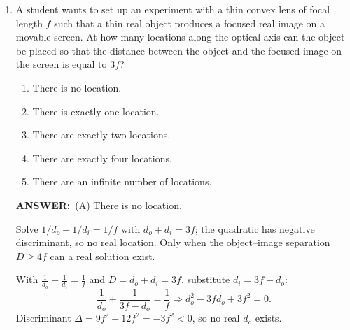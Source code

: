 \documentclass[12pt, a4paper]{article}
\makeatletter
\newcommand{\finalanswer}[1]{\textbf{ANSWER:}~#1}
\newif\if@categoryprinted
\newcommand{\category}[1]{\if@categoryprinted\relax\else\textit{\textcolor{gray}{Category: #1}}\global\@categoryprintedtrue\fi}
\newcommand{\tags}[1]{}
\makeatother
\begin{document}
\begin{CJK*}{UTF8}{gbsn}
\begin{enumerate}[itemsep=1.0em, topsep=0.6em]
\category{Rolling Energy} \tags{}
\begin{answerbox}
\finalanswer{(E) 50 J}
\end{answerbox}
\begin{insightbox}
With pure rolling $v=R\omega$, a solid sphere has $K_{rot}=\tfrac{1}{5}mv^2$, so $K_{trans}=(5/2)K_{rot}$.
\end{insightbox}
\begin{solutionbox}

For a solid sphere, $I=\tfrac{2}{5}mR^2$ and $v=R\omega$. Then $K_{rot}=\tfrac{1}{2}I\omega^2=\tfrac{1}{5}mv^2$. Meanwhile $K_{trans}=\tfrac{1}{2}mv^2=\tfrac{5}{2}K_{rot}=50\,\text{J}$.
\end{solutionbox}

\newpage

\item \label{prob:21}
A student wants to set up an experiment with a thin convex lens of focal length $f$ such that a thin real object produces a focused real image on a movable screen. At how many locations along the optical axis can the object be placed so that the distance between the object and the focused image on the screen is equal to $3f$?
\begin{enumerate}[label=(\Alph*)]
    \item There is no location.
    \item There is exactly one location.
    \item There are exactly two locations.
    \item There are exactly four locations.
    \item There are an infinite number of locations.
\end{enumerate}

\category{Geometric Optics}
\begin{answerbox}
\finalanswer{(A) There is no location.}
\end{answerbox}
\begin{insightbox}
Solve $1/d_o+1/d_i=1/f$ with $d_o+d_i=3f$; the quadratic has negative discriminant, so no real location. Only when the object–image separation $D\ge 4f$ can a real solution exist.
\end{insightbox}
\begin{solutionbox}

With $\tfrac{1}{d_o}+\tfrac{1}{d_i}=\tfrac{1}{f}$ and $D=d_o+d_i=3f$, substitute $d_i=3f-d_o$:
\[
\frac{1}{d_o}+\frac{1}{3f-d_o}=\frac{1}{f} \Rightarrow d_o^2-3fd_o+3f^2=0.
\]
Discriminant $\Delta=9f^2-12f^2=-3f^2<0$, so no real $d_o$ exists.
\end{solutionbox}


\end{enumerate}
\end{CJK*}
\end{document}
